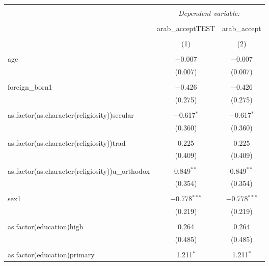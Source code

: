 \documentclass[12pt,letterpaper]{article}
\begin{document}
		\begin{table}[p] \centering 
			\caption{}
			\footnotesize 
			\setlength{\tabcolsep}{1pt} %
			\label{} 
			\renewcommand{\arraystretch}{0.9} %
			\begin{tabular}{@{\extracolsep{1pt}}lcc} 
				\\[-1.8ex]\hline 
				\hline \\[-1.8ex] 
				& \multicolumn{2}{c}{\textit{Dependent variable:}} \\ 
				\cline{2-3} 
				\\[-1.8ex] & arab\_acceptTEST & arab\_accept \\ 
				\\[-1.8ex] & (1) & (2)\\ 
				\hline \\[-1.8ex] 
				age & $-$0.007 & $-$0.007 \\ 
				& (0.007) & (0.007) \\ 
				& & \\ 
				foreign\_born1 & $-$0.426 & $-$0.426 \\ 
				& (0.275) & (0.275) \\ 
				& & \\ 
				as.factor(as.character(religiosity))secular & $-$0.617$^{*}$ & $-$0.617$^{*}$ \\ 
				& (0.360) & (0.360) \\ 
				& & \\ 
				as.factor(as.character(religiosity))trad & 0.225 & 0.225 \\ 
				& (0.409) & (0.409) \\ 
				& & \\ 
				as.factor(as.character(religiosity))u\_orthodox & 0.849$^{**}$ & 0.849$^{**}$ \\ 
				& (0.354) & (0.354) \\ 
				& & \\ 
				sex1 & $-$0.778$^{***}$ & $-$0.778$^{***}$ \\ 
				& (0.219) & (0.219) \\ 
				& & \\ 
				as.factor(education)high & 0.264 & 0.264 \\ 
				& (0.485) & (0.485) \\ 
				& & \\ 
				as.factor(education)primary & 1.211$^{*}$ & 1.211$^{*}$ \\ 

\end{tabular}
\end{table}
\end{document}
